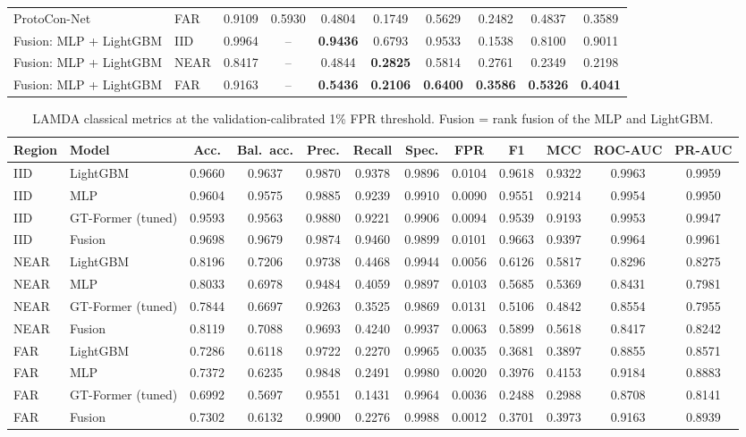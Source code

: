 \documentclass[fleqn,10pt]{wlscirep}
\newcommand{\gtf}{GT\mbox{-}Former}
\newcommand{\lgbm}{LightGBM}
\begin{document}
\begin{table}[!htbp]
\begin{tabular}{llcccccccc}
ProtoCon-Net & FAR & 0.9109 & 0.5930 & 0.4804 & 0.1749 & 0.5629 & 0.2482 & 0.4837 & 0.3589 \\
Fusion: MLP + \lgbm{} & IID & 0.9964 & -- & \textbf{0.9436} & 0.6793 & 0.9533 & 0.1538 & 0.8100 & 0.9011 \\
Fusion: MLP + \lgbm{} & NEAR & 0.8417 & -- & 0.4844 & \textbf{0.2825} & 0.5814 & 0.2761 & 0.2349 & 0.2198 \\
Fusion: MLP + \lgbm{} & FAR & 0.9163 & -- & \textbf{0.5436} & \textbf{0.2106} & \textbf{0.6400} & \textbf{0.3586} & \textbf{0.5326} & \textbf{0.4041} \\
\bottomrule
\end{tabular}
\end{table}

\begin{table}[!htbp]
\centering
\scriptsize
\setlength{\tabcolsep}{2.5pt}
\caption{LAMDA classical metrics at the validation-calibrated 1\% FPR threshold. Fusion = rank fusion of the MLP and \lgbm{}.}
\label{tab:cls-lamda}
\begin{tabular}{llcccccccccc}
\toprule
Region & Model & Acc. & Bal.\ acc. & Prec. & Recall & Spec. & FPR & F1 & MCC & ROC-AUC & PR-AUC \\
\midrule
IID & \lgbm{} & 0.9660 & 0.9637 & 0.9870 & 0.9378 & 0.9896 & 0.0104 & 0.9618 & 0.9322 & 0.9963 & 0.9959 \\
IID & MLP & 0.9604 & 0.9575 & 0.9885 & 0.9239 & 0.9910 & 0.0090 & 0.9551 & 0.9214 & 0.9954 & 0.9950 \\
IID & \gtf{} (tuned) & 0.9593 & 0.9563 & 0.9880 & 0.9221 & 0.9906 & 0.0094 & 0.9539 & 0.9193 & 0.9953 & 0.9947 \\
IID & Fusion & 0.9698 & 0.9679 & 0.9874 & 0.9460 & 0.9899 & 0.0101 & 0.9663 & 0.9397 & 0.9964 & 0.9961 \\
NEAR & \lgbm{} & 0.8196 & 0.7206 & 0.9738 & 0.4468 & 0.9944 & 0.0056 & 0.6126 & 0.5817 & 0.8296 & 0.8275 \\
NEAR & MLP & 0.8033 & 0.6978 & 0.9484 & 0.4059 & 0.9897 & 0.0103 & 0.5685 & 0.5369 & 0.8431 & 0.7981 \\
NEAR & \gtf{} (tuned) & 0.7844 & 0.6697 & 0.9263 & 0.3525 & 0.9869 & 0.0131 & 0.5106 & 0.4842 & 0.8554 & 0.7955 \\
NEAR & Fusion & 0.8119 & 0.7088 & 0.9693 & 0.4240 & 0.9937 & 0.0063 & 0.5899 & 0.5618 & 0.8417 & 0.8242 \\
FAR & \lgbm{} & 0.7286 & 0.6118 & 0.9722 & 0.2270 & 0.9965 & 0.0035 & 0.3681 & 0.3897 & 0.8855 & 0.8571 \\
FAR & MLP & 0.7372 & 0.6235 & 0.9848 & 0.2491 & 0.9980 & 0.0020 & 0.3976 & 0.4153 & 0.9184 & 0.8883 \\
FAR & \gtf{} (tuned) & 0.6992 & 0.5697 & 0.9551 & 0.1431 & 0.9964 & 0.0036 & 0.2488 & 0.2988 & 0.8708 & 0.8141 \\
FAR & Fusion & 0.7302 & 0.6132 & 0.9900 & 0.2276 & 0.9988 & 0.0012 & 0.3701 & 0.3973 & 0.9163 & 0.8939 \\
\bottomrule
\end{tabular}
\end{table}
\end{document}
